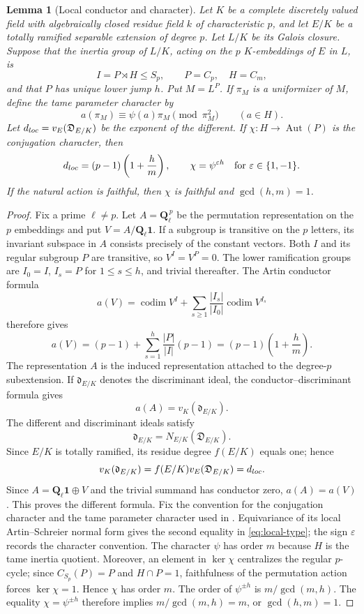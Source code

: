 \documentclass[10pt,a4paper]{amsart}
\newtheorem{lemma}[theorem]{Lemma}
\numberwithin{equation}{section}
\begin{document}
\begin{lemma}[Local conductor and character]\label{lem:local}
Let $K$ be a complete discretely valued field with algebraically closed
residue field $k$ of characteristic $p$, and let $E/K$ be a totally ramified
separable extension of degree $p$.  Let $L/K$ be its Galois closure.  Suppose
that the inertia group of $L/K$, acting on the $p$ $K$-embeddings of $E$ in
$L$, is
\[
 I=P\rtimes H\leq S_p,\qquad P=C_p,\quad H=C_m,
\]
and that $P$ has unique lower jump $h$.  Put $M=L^P$.  If $\pi_M$ is a
uniformizer of $M$, define the tame parameter character by
\[
 a(\pi_M)\equiv\psi(a)\pi_M\pmod{\pi_M^2}\qquad(a\in H).
\]
Let $d_{\rm loc}=v_E(\mathfrak D_{E/K})$ be the exponent of the different.
If $\chi:H\to\operatorname{Aut}(P)$ is the conjugation character, then
\[
 d_{\rm loc}=(p-1)\left(1+\frac hm\right),\qquad
 \chi=\psi^{\varepsilon h}\quad\text{for }\varepsilon\in\{1,-1\}.
 \label{eq:local-type}
\]
If the natural action is faithful, then $\chi$ is faithful and
$\gcd(h,m)=1$.
\end{lemma}

\begin{proof}
Fix a prime $\ell\ne p$.  Let $A=\mathbf Q_\ell^{\,p}$ be the permutation
representation on the $p$ embeddings and put
$V=A/\mathbf Q_\ell\mathbf 1$.  If a subgroup is transitive on the $p$
letters, its invariant subspace in $A$ consists precisely of the constant
vectors.  Both $I$ and its regular subgroup $P$ are transitive, so
$V^I=V^P=0$.  The lower ramification groups are
$I_0=I$, $I_s=P$ for $1\leq s\leq h$, and trivial thereafter.  The Artin
conductor formula
\[
 a(V)=\operatorname{codim}V^I+
 \sum_{s\geq1}\frac{|I_s|}{|I_0|}\operatorname{codim}V^{I_s}
\]
therefore gives
\[
 a(V)=(p-1)+
 \sum_{s=1}^{h}\frac{|P|}{|I|}(p-1)
 =(p-1)\left(1+\frac hm\right).
\]
The representation $A$ is the induced representation attached to the
degree-$p$ subextension.  If $\mathfrak d_{E/K}$ denotes the discriminant
ideal, the conductor--discriminant formula gives
\[
 a(A)=v_K(\mathfrak d_{E/K}).
\]
The different and discriminant ideals satisfy
\[
 \mathfrak d_{E/K}=N_{E/K}(\mathfrak D_{E/K}).
\]
Since $E/K$ is totally
ramified, its residue degree $f(E/K)$ equals one; hence
\[
 v_K(\mathfrak d_{E/K})
 =f(E/K)v_E(\mathfrak D_{E/K})=d_{\rm loc}.
\]
Since
$A=\mathbf Q_\ell\mathbf 1\oplus V$ and the trivial summand has conductor
zero, $a(A)=a(V)$.  This proves the different formula.
Fix the convention for the conjugation character and the tame parameter
character used in \cite[Lemma 2.12]{WewersThree}.  Equivariance of its local
Artin--Schreier normal form gives the second equality in
\eqref{eq:local-type}; the sign $\varepsilon$ records the character
convention.  The character $\psi$ has
order $m$ because $H$ is the tame inertia quotient.  Moreover, an element in
$\ker\chi$ centralizes the regular $p$-cycle;
since $C_{S_p}(P)=P$ and $H\cap P=1$, faithfulness of the permutation action
forces $\ker\chi=1$.  Hence $\chi$ has order $m$.  The order of
$\psi^{\pm h}$ is $m/\gcd(m,h)$.  The equality
$\chi=\psi^{\pm h}$ therefore implies $m/\gcd(m,h)=m$, or
$\gcd(h,m)=1$.
\end{proof}
\end{document}
